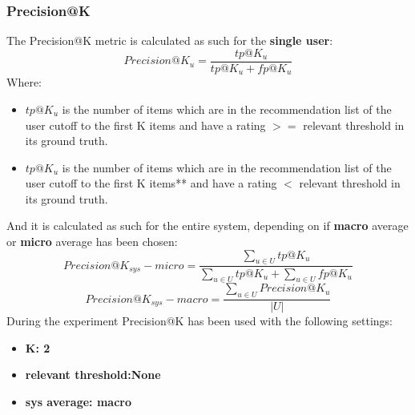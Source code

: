 \documentclass[11pt]{article}
\begin{document}
\subsubsection{Precision@K}\label{sec:prec-k}
The Precision@K metric is calculated as such for the \textbf{single user}:
\hfill\break
\hfill\break
    \[
        Precision@K_u = \frac{tp@K_u}{tp@K_u + fp@K_u}
    \]
\hfill\break
\hfill\break
    Where:
\begin{itemize}
    \item $tp@K_u$ is the number of items which are in the recommendation list of the user
      cutoff to the first K items and have a rating $>=$ relevant threshold in its ground truth.
    \item $tp@K_u$ is the number of items which are in the recommendation list of the user
      cutoff to the first K items** and have a rating $<$ relevant threshold in its ground truth.
\end{itemize}
\hfill\break
\hfill\break
And it is calculated as such for the entire system, depending on if \textbf{macro} average or \textbf{micro} average
has been chosen:
\hfill\break
\hfill\break
   \[
       Precision@K_{sys} - micro = \frac{\sum_{u \in U} tp@K_u}{\sum_{u \in U} tp@K_u + \sum_{u \in U} fp@K_u}
   \]
\hfill\break
\hfill\break
    \[
       Precision@K_{sys} - macro = \frac{\sum_{u \in U} Precision@K_u}{|U|}
   \]
\hfill\break
\hfill\break
During the experiment Precision@K has been used with the following settings:
\begin{itemize}
    \item \textbf{K: 2 }
    \item \textbf{relevant threshold:None }
    \item \textbf{sys average: macro }
\end{itemize}
\hfill\break
\hfill\break




\end{document}
